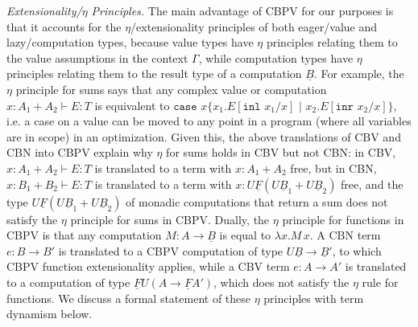 \documentclass[acmsmall,nonacm]{acmart}
\renewcommand{\u}{\underline}
\newcommand{\pipe}{\,\,|\,\,}
\newcommand{\ltdyn}{\sqsubseteq}
\newcommand{\gtdyn}{\sqsupseteq}
\newcommand{\equidyn}{\mathrel{\gtdyn\ltdyn}}
\newcommand{\inl}{\kw{inl}}
\newcommand{\inr}{\kw{inr}}
\newcommand{\print}{\kw{print}}
\newcommand{\case}{\kw{case}}
\newcommand{\kw}[1]{\texttt{#1}\,\,}
\newcommand{\caseofXthenYelseZ}[3]{\case #1 \{ #2 \pipe #3 \}}
\begin{document}




\emph{Extensionality/$\eta$ Principles.}  The main advantage of CBPV for
our purposes is that it accounts for the $\eta$/extensionality
principles of both eager/value and lazy/computation types, because
value types have $\eta$ principles relating them to the value
assumptions in the context $\Gamma$, while computation types have $\eta$
principles relating them to the result type of a computation $\u B$.  For
example, the $\eta$ principle for sums says that any complex
value or computation $x : A_1 + A_2 \vdash E : T$ is equivalent to
$\caseofXthenYelseZ{x}{x_1.E[\inl{x_1}/x]}{x_2.E[\inr{x_2}/x]}$, i.e. a
case on a value can be moved to any point in a program (where all
variables are in scope) in an optimization.  Given this, the above
translations of CBV and CBN into CBPV explain why $\eta$ for
sums holds in CBV but not CBN: in CBV, $x : A_1 + A_2 \vdash E : T$ is
translated to a term with $x : A_1 + A_2$ free, but in CBN, $x : B_1 +
B_2 \vdash E : T$ is translated to a term with $x : U \u F(U \u B_1 + U
\u B_2)$ free, and the type $U \u F(U \u B_1 + U \u B_2)$ of monadic
computations that return a sum does not satisfy the $\eta$ principle for
sums in CBPV.  Dually, the $\eta$ principle for functions in CBPV is
that any computation $M : A \to \u B$ is equal to $\lambda x.M \, x$.  A
CBN term $e : B \to B'$ is translated to a CBPV computation of type $U
\u B \to \u B'$, to which CBPV function extensionality applies, while a
CBV term $e : A \to A'$ is translated to a computation of type $\u F U(A
\to \u F A')$, which does not satisfy the $\eta$ rule for functions.  We
discuss a formal statement of these $\eta$ principles with term
dynamism below.
\end{document}
